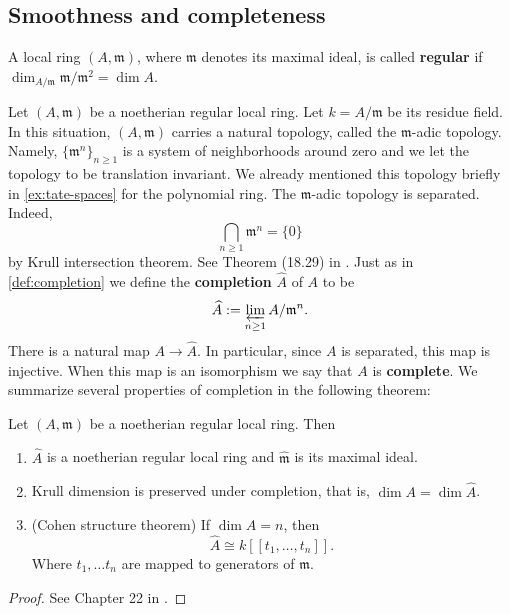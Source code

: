 \subsection{Smoothness and completeness}
\begin{definition}\label{def:regular-local-ring}
	A local ring $(A, \mathfrak{m})$, where $\mathfrak{m}$ denotes its maximal ideal, is called \textbf{regular} if $\dim_{A/\mathfrak{m}} \mathfrak{m}/\mathfrak{m}^{2} = \dim A$. 
\end{definition}
Let $(A,\mathfrak{m})$ be a noetherian regular local ring. Let $k = A/\mathfrak{m}$ be its residue field. In this situation, $(A,\mathfrak{m})$ carries a natural topology, called the $\mathfrak{m}$-adic topology. Namely, $\{\mathfrak{m}^{n}\}_{n\geq 1}$ is a system of neighborhoods around zero and we let the topology to be translation invariant. We already mentioned this topology briefly in \cref{ex:tate-spaces} for the polynomial ring. The $\mathfrak{m}$-adic topology is separated. Indeed, 
\[
	\bigcap_{n\geq 1} \mathfrak{m}^{n} = \{0\}
\]
by Krull intersection theorem. See Theorem (18.29) in \cite{comm-alg}. Just as in \cref{def:completion} we define the \textbf{completion} $\widehat{A}$ of $A$ to be 
\[
	\widehat{A} := \varprojlim_{n\geq 1} A/\mathfrak{m}^{n}.
\]
There is a natural map $A \to \widehat{A}$. In particular, since $A$ is separated, this map is injective. When this map is an isomorphism we say that $A$ is \textbf{complete}. We summarize several properties of completion in the following theorem:
\begin{theorem}\label{thm:properties-adic-completion}
	Let $(A,\mathfrak{m})$ be a noetherian regular local ring. Then
	\begin{enumerate}[label = (\alph*)]
		\item $\widehat{A}$ is a noetherian regular local ring and $\widehat{\mathfrak{m}}$ is its maximal ideal.
		\item Krull dimension is preserved under completion, that is, $\dim A = \dim \widehat{A}$.
		\item (Cohen structure theorem) If $\dim A = n$, then
		\[
			\widehat{A} \cong k\left[[t_{1}, \ldots, t_{n}]\right].
		\]
		Where $t_{1}, \ldots t_{n}$ are mapped to generators of $\mathfrak{m}$.
	\end{enumerate}
	\begin{proof}
	See Chapter 22 in \cite{comm-alg}.  
	\end{proof}
	
\end{theorem}

